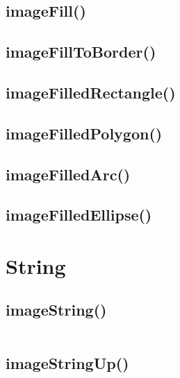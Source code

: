 \subsection{imageFill()}




\subsection{imageFillToBorder()}



\subsection{imageFilledRectangle()}





\subsection{imageFilledPolygon()}




\subsection{imageFilledArc()}



\subsection{imageFilledEllipse()}



\section{String}





\subsection{imageString()}


\begin{lstlisting}[language=PHP]

\end{lstlisting}

\subsection{imageStringUp()}


